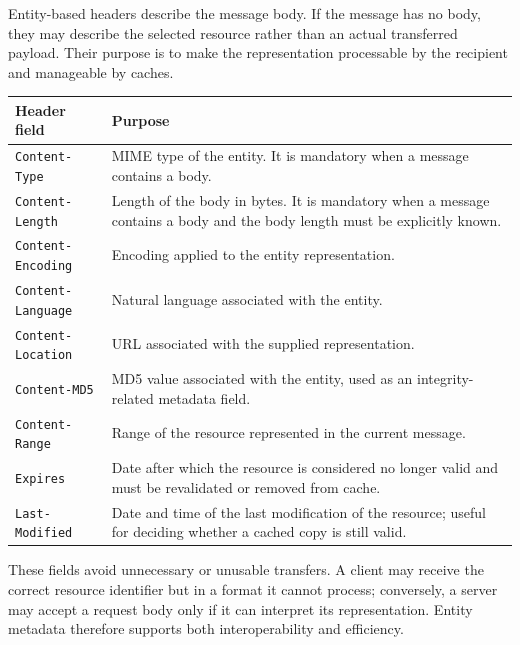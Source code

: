 \documentclass{scrbook}
\begin{document}
Entity-based headers describe the message body. If the message has no body, they may describe the selected resource rather than an actual transferred payload. Their purpose is to make the representation processable by the recipient and manageable by caches.

\begin{table}[!h]
	\begin{tabularx}{\linewidth}{p{}X}
	\textbf{Header field} & \textbf{Purpose} \\
	\hline
	
	\texttt{Content-Type} & MIME type of the entity. It is mandatory when a message contains a body. \\ \hline
	
	\texttt{Content-Length} & Length of the body in bytes. It is mandatory when a message contains a body and the body length must be explicitly known. \\ \hline
	
	\texttt{Content-Encoding} & Encoding applied to the entity representation. \\ \hline
	
	\texttt{Content-Language} & Natural language associated with the entity. \\ \hline
	
	\texttt{Content-Location} & URL associated with the supplied representation. \\ \hline
	
	\texttt{Content-MD5} & MD5 value associated with the entity, used as an integrity-related metadata field. \\ \hline
	
	\texttt{Content-Range} & Range of the resource represented in the current message. \\ \hline
	
	\texttt{Expires} & Date after which the resource is considered no longer valid and must be revalidated or removed from cache. \\ \hline
	
	\texttt{Last-Modified} & Date and time of the last modification of the resource; useful for deciding whether a cached copy is still valid. \\ \hline
	\end{tabularx}
\end{table}

These fields avoid unnecessary or unusable transfers. A client may receive the correct resource identifier but in a format it cannot process; conversely, a server may accept a request body only if it can interpret its representation. Entity metadata therefore supports both interoperability and efficiency.\\
\end{document}
